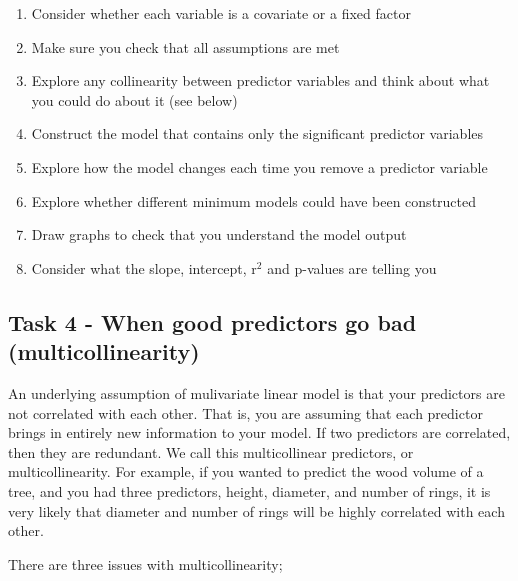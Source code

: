 \documentclass[
]{book}
\providecommand{\tightlist}{%
  \setlength{\itemsep}{0pt}\setlength{\parskip}{0pt}}
\begin{document}
\begin{enumerate}
\def\labelenumi{\arabic{enumi})}
\tightlist
\item
  Consider whether each variable is a covariate or a fixed factor
\item
  Make sure you check that all assumptions are met
\item
  Explore any collinearity between predictor variables and think about what you could do about it (see below)
\item
  Construct the model that contains only the significant predictor variables
\item
  Explore how the model changes each time you remove a predictor variable
\item
  Explore whether different minimum models could have been constructed
\item
  Draw graphs to check that you understand the model output
\item
  Consider what the slope, intercept, r\(^2\) and p-values are telling you
\end{enumerate}

\subsection{Task 4 - When good predictors go bad (multicollinearity)}\label{task-4---when-good-predictors-go-bad-multicollinearity}

An underlying assumption of mulivariate linear model is that your predictors are not correlated with each other. That is, you are assuming that each predictor brings in entirely new information to your model. If two predictors are correlated, then they are redundant. We call this multicollinear predictors, or multicollinearity. For example, if you wanted to predict the wood volume of a tree, and you had three predictors, height, diameter, and number of rings, it is very likely that diameter and number of rings will be highly correlated with each other.

There are three issues with multicollinearity;
\end{document}
